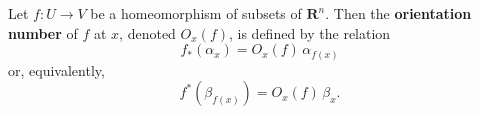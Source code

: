 Let $f: U \to V$ be a homeomorphism of subsets of $\mathbf{R}^n$. Then the \textbf{orientation number} of $f$ at $x$, denoted $O_x(f)$, is defined by the relation
$$f_*(\alpha_x) = O_x(f)\,\alpha_{f(x)}$$
or, equivalently,
$$f^*(\beta_{f(x)}) = O_x(f)\,\beta_x.$$
